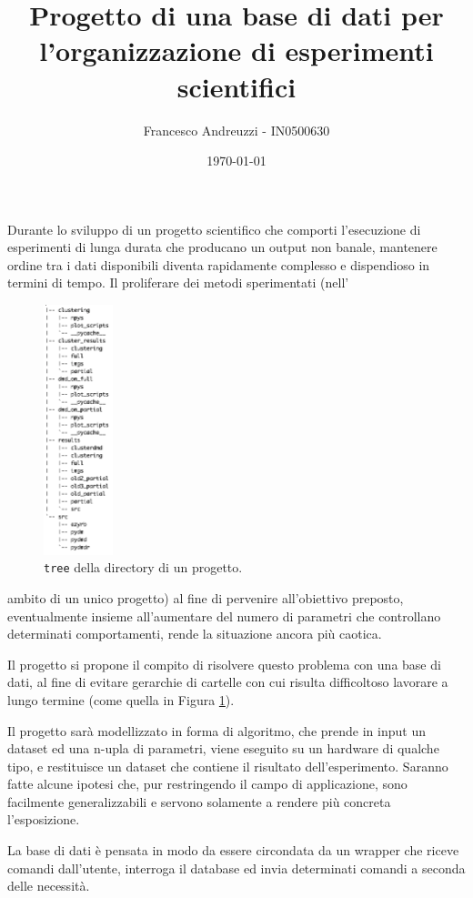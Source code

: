 \documentclass{article}
\title{Progetto di una base di dati per l'organizzazione di esperimenti scientifici}
\author{Francesco Andreuzzi - IN0500630}
\date{\today}
\begin{document}
\maketitle

Durante lo sviluppo di un progetto scientifico che comporti l'esecuzione di esperimenti di lunga durata che producano un output non banale, mantenere ordine tra i dati disponibili diventa rapidamente complesso e dispendioso in termini di tempo. Il proliferare dei metodi sperimentati (nell'\hphantom{xcjxxsksjskksksk}
\begin{figure}
    \vspace{-0.9cm}
    \includegraphics[width=2cm]{res/tree_brutto.png}
    \caption{\texttt{tree} della directory di un progetto.}\label{fig:tree}
\end{figure}
ambito di un unico progetto) al fine di pervenire all'obiettivo preposto, eventualmente insieme all'aumentare del numero di parametri che controllano determinati comportamenti, rende la situazione ancora più caotica.

Il progetto si propone il compito di risolvere questo problema con una base di dati, al fine di evitare gerarchie di cartelle con cui risulta difficoltoso lavorare a lungo termine (come quella in Figura \ref{fig:tree}).

Il progetto sarà modellizzato in forma di algoritmo, che prende in input un dataset ed una n-upla di parametri, viene eseguito su un hardware di qualche tipo, e restituisce un dataset che contiene il risultato dell'esperimento. Saranno fatte alcune ipotesi che, pur restringendo il campo di applicazione, sono facilmente generalizzabili e servono solamente a rendere più concreta l'esposizione.

La base di dati è pensata in modo da essere circondata da un wrapper che riceve comandi dall'utente, interroga il database ed invia determinati comandi a seconda delle necessità.
\end{document}
